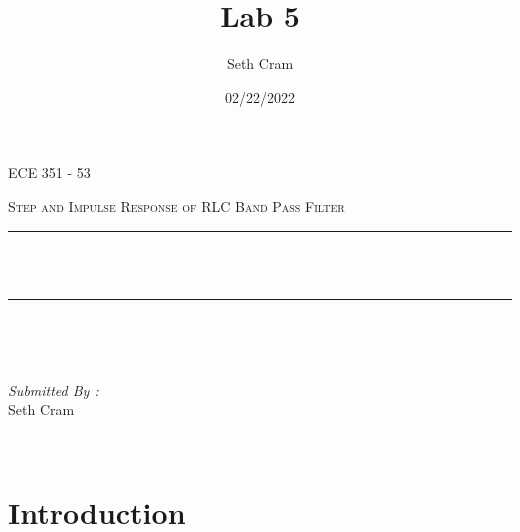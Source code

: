 \documentclass[12pt]{report}
\title{Lab 5}		%
\author{ Seth Cram}
\date{02/22/2022}
\makeatletter
\let\thetitle\@title
\makeatother
\begin{document}

\begin{titlepage}
	\centering
    \vspace*{0.5 cm}
\begin{center}    \textsc{\Large   ECE 351 - 53 }\\[2.0 cm]	\end{center}%
	\textsc{\Large Step and Impulse Response of RLC Band Pass Filter }\\[.5 cm]				%
	\rule{\linewidth}{0.2 mm} \\[0.4 cm]
	{ \huge \bfseries \thetitle}\\
	\rule{\linewidth}{0.2 mm} \\[1.5 cm]
	
	\begin{minipage}{0.4\textwidth}
		\begin{flushleft} \large
			\end{flushleft}
			\end{minipage}~
			\begin{minipage}{0.4\textwidth}
            
			\begin{flushright} \large
			\emph{Submitted By :} \\
			Seth Cram  
		\end{flushright}
           
	\end{minipage}\\[2 cm]
	
\end{titlepage}


\tableofcontents
\pagebreak

\renewcommand{\thesection}{\arabic{section}}

\section{Introduction}
\end{document}
